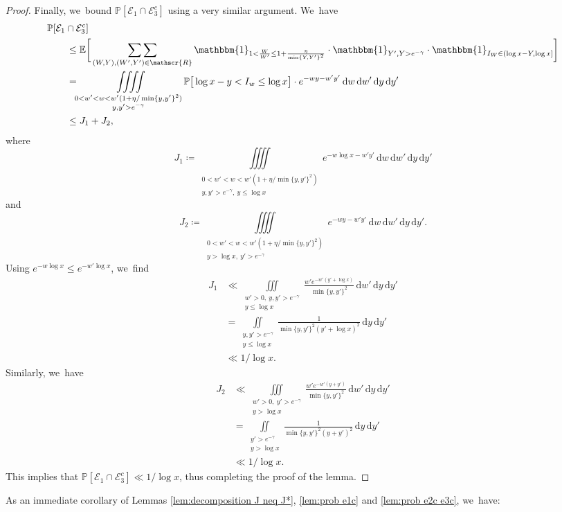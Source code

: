 \documentclass[10pt]{amsart}
\newcommand{\PP}{\mathbb{P}}
\newcommand{\EE}{\mathbb{E}}
\newcommand{\dee}{\,\mathrm{d}}
\newcommand{\one}{\mathbbm{1}}
\newcommand{\EC}{\mathcal{E}}
\newcommand{\RS}{\mathscr{R}}
\newcommand{\bg}{\big}
\newcommand{\bggg}{\bigg}
\theoremstyle{plain}
\theoremstyle{definition}
\begin{document}
\begin{proof}
Finally, we~bound $\PP[\EC_1 \cap \EC_3^c]$ using a very similar argument. We~have
\[
\begin{split}
&\PP[\EC_1 \cap \EC_3^c] \\
&\qquad \le
\EE\bggg[ \mathop{\sum\sum}_{(W,Y),(W',Y') \in\RS} \one_{1<\frac{W}{W'}\le 1+\frac{\eta}{\min\{Y,Y'\}^2}}\cdot\one_{Y',Y>e^{-\gamma}} \cdot \one_{I_W\in(\log x-Y,\log x]} \bggg] \\
&\qquad =
\iiiint\limits_{\substack{0 < w'<w < w'(1+\eta/\min\{y,y'\}^2)\\ y, y' > e^{-\gamma}}} \PP\bg[\log x - y<I_w \le \log x\bg]\cdot e^{-wy-w'y'}
\dee w\dee w'\dee y\dee y' \\
&\qquad \le J_1+J_2,
\end{split}
\]
where
\[
J_1 \coloneqq \iiiint\limits_{\substack{0 < w'<w < w'(1+\eta/\min\{y,y'\}^2)\\ y, y' > e^{-\gamma},\ y\le \log x}} e^{-w\log x-w'y'}
\dee w\dee w'\dee y\dee y'
\]
and
\[
J_2 \coloneqq \iiiint\limits_{\substack{0 < w'<w < w'(1+\eta/\min\{y,y'\}^2)\\ y>\log x,\ y' > e^{-\gamma}}} e^{-wy-w'y'}
\dee w\dee w'\dee y\dee y'.
\]
Using $e^{-w\log x}\le e^{-w'\log x}$, we~find
\begin{align*}
J_1&\ll \iiint\limits_{\substack{w'>0,\ y, y' > e^{-\gamma}\\ y\le \log x}} \frac{w'e^{-w'(y'+\log x)}}{\min\{y,y'\}^2} \dee w'\dee y\dee y' \\
&= \iint\limits_{\substack{y, y' > e^{-\gamma} \\ y\le \log x}} \frac{1}{\min\{y,y'\}^2(y'+\log x)^2} \dee y\dee y'\\
& \ll1/\log x.
\end{align*}
Similarly, we~have
\begin{align*}
J_2&\ll \iiint\limits_{\substack{w'>0,\ y' > e^{-\gamma}\\ y>\log x}} \frac{w'e^{-w'(y+y')} }{\min\{y,y'\}^2} \dee w'\dee y\dee y' \\
&= \iint\limits_{\substack{y' > e^{-\gamma} \\ y>\log x}} \frac{1}{\min\{y,y'\}^2(y+y')^2} \dee y\dee y'\\
& \ll1/\log x.
\end{align*}
This implies that $\PP[\EC_1\cap\EC_3^c]\ll 1/\log x$, thus completing the proof of the lemma.
\end{proof}

As an immediate corollary of Lemmas \ref{lem:decomposition J neq J*}, \ref{lem:prob e1c} and \ref{lem:prob e2c e3c}, we~have:
\end{document}

